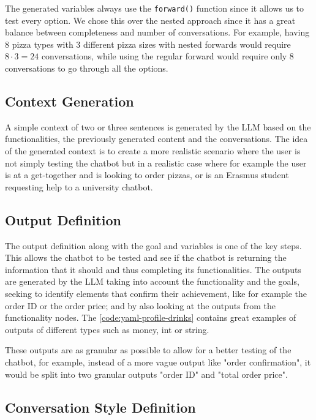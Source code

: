 The generated variables always use the \texttt{forward()} function
since it allows us to test every option.
We chose this over the nested approach
since it has a great balance between completeness and number of conversations.
For example, having $8$ pizza types with $3$ different pizza sizes
with nested forwards would require $8 \cdot 3 = 24$ conversations,
while using the regular forward would require only $8$ conversations
to go through all the options.

\subsection{Context Generation}

A simple context of two or three sentences
is generated by the \ac{LLM} based on
the functionalities, the previously generated content and the conversations.
The idea of the generated context is to create a more realistic scenario
where the user is not simply testing the chatbot
but in a realistic case where for example
the user is at a get-together and is looking to order pizzas,
or is an Erasmus student requesting help to a university chatbot.

\subsection{Output Definition}

The output definition along with the goal and variables is one of the key steps.
This allows the chatbot to be tested
and see if the chatbot is returning the information that it should
and thus completing its functionalities.
The outputs are generated by the \ac{LLM}
taking into account the functionality and the goals,
seeking to identify elements that confirm their achievement,
like for example the order ID or the order price;
and by also looking at the outputs from the functionality nodes.
The \autoref{code:yaml-profile-drinks} contains great examples
of outputs of different types such as money, int or string.

These outputs are as granular as possible
to allow for a better testing of the chatbot,
for example, instead of a more vague output like
"order confirmation", it would be split into two granular outputs
"order ID" and "total order price".

\subsection{Conversation Style Definition}

